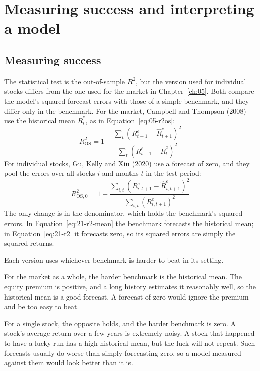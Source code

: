 \section{Measuring success and interpreting a model}
\label{sec:21-measure}

\subsection{Measuring success}

The statistical test is the out-of-sample $R^2$, but the version used for individual stocks differs from the one used for the market in Chapter~\ref{ch:05}. Both compare the model's squared forecast errors with those of a simple benchmark, and they differ only in the benchmark. For the market, Campbell and Thompson (2008) use the historical mean $\bar{R}^{e}_t$, as in Equation~\eqref{eq:05-r2os}:
\begin{equation}
  R^2_{\text{OS}} = 1 - \frac{\sum_{t} \left(R^{e}_{t+1} - \hat{R}^{e}_{t+1}\right)^2}{\sum_{t} \left(R^{e}_{t+1} - \bar{R}^{e}_t\right)^2}
  \label{eq:21-r2-mean}
\end{equation}
For individual stocks, Gu, Kelly and Xiu (2020) use a forecast of zero, and they pool the errors over all stocks $i$ and months $t$ in the test period:
\begin{equation}
  R^2_{\text{OS},0} = 1 - \frac{\sum_{i,t} \left(R^{e}_{i,t+1} - \hat{R}^{e}_{i,t+1}\right)^2}{\sum_{i,t} \left(R^{e}_{i,t+1}\right)^2}
  \label{eq:21-r2}
\end{equation}
The only change is in the denominator, which holds the benchmark's squared errors. In Equation~\eqref{eq:21-r2-mean} the benchmark forecasts the historical mean; in Equation~\eqref{eq:21-r2} it forecasts zero, so its squared errors are simply the squared returns.


Each version uses whichever benchmark is harder to beat in its setting.

For the market as a whole, the harder benchmark is the historical mean. The equity premium is positive, and a long history estimates it reasonably well, so the historical mean is a good forecast. A forecast of zero would ignore the premium and be too easy to beat.

For a single stock, the opposite holds, and the harder benchmark is zero. A stock's average return over a few years is extremely noisy. A stock that happened to have a lucky run has a high historical mean, but the luck will not repeat. Such forecasts usually do worse than simply forecasting zero, so a model measured against them would look better than it is.

